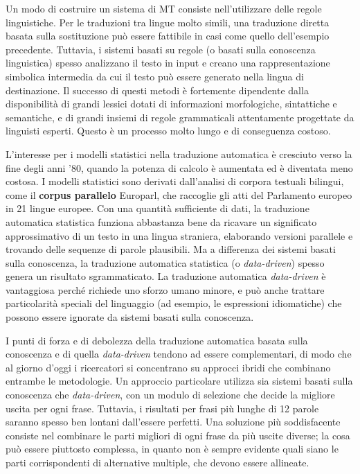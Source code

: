 \begin{multicols}{2}
Un modo di costruire un sistema di MT consiste nell'utilizzare delle regole linguistiche. Per le traduzioni tra lingue molto simili, una traduzione diretta basata sulla sostituzione pu\`{o} essere fattibile in casi come quello dell'esempio precedente. Tuttavia, i sistemi basati su regole (o basati sulla conoscenza linguistica) spesso analizzano il testo in input e creano una rappresentazione simbolica intermedia da cui il testo pu\`{o} essere generato nella lingua di destinazione. Il successo di questi metodi \`{e} fortemente dipendente dalla disponibilit\`{a} di grandi lessici dotati di informazioni morfologiche, sintattiche e semantiche, e di grandi insiemi di regole grammaticali attentamente progettate da linguisti esperti. Questo \`{e} un processo molto lungo e di conseguenza costoso.

L'interesse per i modelli statistici nella traduzione automatica \`{e} cresciuto verso la fine degli anni '80, quando la potenza di calcolo \`{e} aumentata ed \`{e} diventata meno costosa. I modelli statistici sono derivati dall'analisi di corpora testuali bilingui, come il \textbf{corpus parallelo} Europarl, che raccoglie gli atti del Parlamento europeo in 21 lingue europee. Con una quantit\`{a} sufficiente di dati, la traduzione automatica statistica funziona abbastanza bene da ricavare un significato approssimativo di un testo in una lingua straniera, elaborando versioni parallele e trovando delle sequenze di parole plausibili. Ma a differenza dei sistemi basati sulla conoscenza, la traduzione automatica statistica (o \emph{data-driven}) spesso genera un risultato sgrammaticato. La traduzione automatica \emph{data-driven} \`{e} vantaggiosa perch\'{e} richiede uno sforzo umano minore, e pu\`{o} anche trattare particolarit\`{a} speciali del linguaggio (ad esempio, le espressioni idiomatiche) che possono essere ignorate da sistemi basati sulla conoscenza.

I punti di forza e di debolezza della traduzione automatica basata sulla conoscenza e di quella \emph{data-driven} tendono ad essere complementari, di modo che al giorno d'oggi i ricercatori si concentrano su approcci ibridi che combinano entrambe le metodologie. Un approccio particolare utilizza sia sistemi basati sulla conoscenza che \emph{data-driven}, con un modulo di selezione che decide la migliore uscita per ogni frase. Tuttavia, i risultati per frasi pi\`{u} lunghe di 12 parole saranno spesso ben lontani dall'essere perfetti. Una soluzione pi\`{u} soddisfacente consiste nel combinare le parti migliori di ogni frase da pi\`{u} uscite diverse; la cosa pu\`{o} essere piuttosto complessa, in quanto non \`{e} sempre evidente quali siano le parti corrispondenti di alternative multiple, che devono essere allineate.


\end{multicols}
